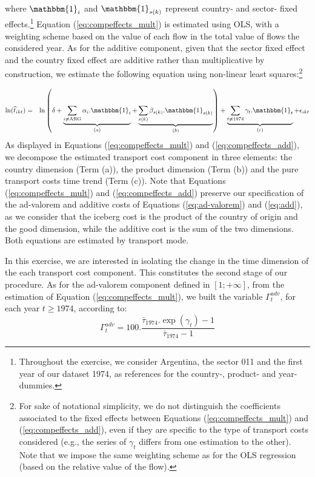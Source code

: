 \documentclass[a4paper,11pt]{article}
\begin{document}
\noindent where $\mathbbm{1}_i$ and $\mathbbm{1}_{s(k)}$ represent country- and sector- fixed effects.\footnote{Throughout the exercise, we consider Argentina, the sector 011 and the first year of our dataset 1974, as references for the country-, product- and year- dummies.}  Equation (\ref{eq:compeffects_mult}) is estimated using OLS, with a weighting scheme based on the value of each flow in the total value of flows the considered year.
As for the additive component, given that the sector fixed effect and the country fixed effect are additive rather than multiplicative by construction, we estimate the following equation using non-linear least squares:\footnote{For sake of notational simplicity, we do not distinguish the coefficients associated to the fixed effects between Equations (\ref{eq:compeffects_mult}) and (\ref{eq:compeffects_add}), even if they are specific to the type of transport costs considered (e.g., the series of $\gamma_t$ differs from one estimation to the other).
Note that we impose the same weighting scheme as for the OLS regression (based on the relative value of the flow).}

\begin{eqnarray}
\ln(\widehat{t}_{ikt})&=&\ln\left( \delta + \underbrace{\sum_{i \neq \text{ARG}}  \alpha_i.\mathbbm{1}_i}_{(a)}+\underbrace{\sum_{s(k)}\beta_{s(k)}.\mathbbm{1}_{s(k)}}_{(b)}\right) + \underbrace{\sum_{t \neq 1974}\gamma_t.\mathbbm{1}_t}_{(c)}+\epsilon_{ikt} \label{eq:compeffects_add}
\end{eqnarray}
As displayed in Equations (\ref{eq:compeffects_mult}) and (\ref{eq:compeffects_add}), we decompose the estimated transport cost component in three elements: the country dimension (Term (a)), the product dimension (Term (b)) and the pure transport costs time trend (Term (c)).
Note that Equations (\ref{eq:compeffects_mult}) and (\ref{eq:compeffects_add}) preserve our specification of the ad-valorem and additive costs of Equations (\ref{eq:ad-valorem}) and (\ref{eq:add}), as we consider that the iceberg cost is the product of the country of origin and the good dimension, while the additive cost is the sum of the two dimensions.
Both equations are estimated by transport mode.\smallskip

In this exercise, we are interested in isolating the change in the time dimension of the each transport cost component.
This constitutes the second stage of our procedure.
As for the ad-valorem component defined in $[1;+\infty]$, from the estimation of Equation (\ref{eq:compeffects_mult}), we built the variable $\Gamma^{adv}_t$, for each year $t\geq 1974$, according to:
\begin{equation}
\Gamma^{adv}_t = 100.\frac {\bar{\tau}_{1974}.\exp(\gamma_t)-1} {\bar{\tau}_{1974}-1} \label{eq:comp_effects_adv}
\end{equation}
\end{document}
